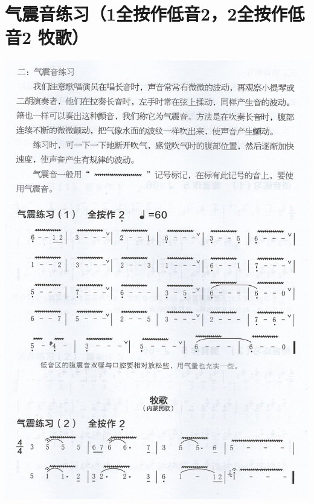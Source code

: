 \documentclass[cn,pad,chinese,chinesefont=nofont]{elegantbook}
\begin{document}
\section{气震音练习（1全按作低音2，2全按作低音2 牧歌）}
\includegraphics[height=\textheight]{dongxiao/Scan 8.jpeg}
\end{document}

